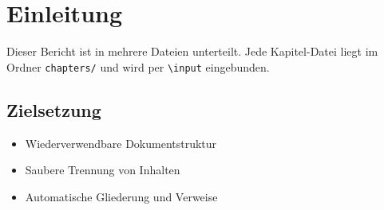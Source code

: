 \section{Einleitung}
\label{sec:einleitung}

Dieser Bericht ist in mehrere Dateien unterteilt. Jede Kapitel-Datei liegt im
Ordner \texttt{chapters/} und wird per \texttt{\textbackslash input} eingebunden.

\subsection{Zielsetzung}
\begin{itemize}
  \item Wiederverwendbare Dokumentstruktur
  \item Saubere Trennung von Inhalten
  \item Automatische Gliederung und Verweise
\end{itemize}
